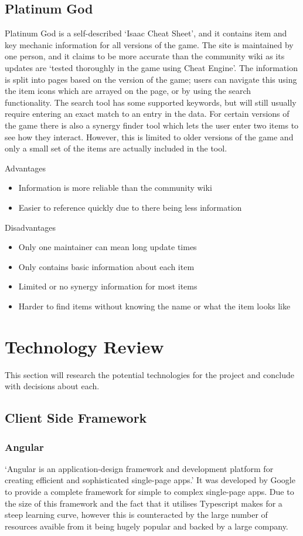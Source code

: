 \subsection*{Platinum God}
Platinum God is a self-described `Isaac Cheat Sheet'\cite{IsaacCheatSheet}, and it contains item and key mechanic 
information for all versions of the game. The site is maintained by one person, and it claims to be more accurate than 
the community wiki as its updates are `tested thoroughly in the game using Cheat Engine'\cite{FrequentlyAskedQuestions}. 
The information is split into pages based on the version of the game; users can navigate this using the item icons which
 are arrayed on the page, or by using the search functionality. The search tool has some supported keywords, but will 
still usually require entering an exact match to an entry in the data. For certain versions of the game there is also a 
synergy finder tool which lets the user enter two items to see how they interact. However, this is limited to older 
versions of the game and only a small set of the items are actually included in the tool. \par
Advantages
\begin{itemize}
    \item Information is more reliable than the community wiki
    \item Easier to reference quickly due to there being less information
\end{itemize}
Disadvantages
\begin{itemize}
    \item Only one maintainer can mean long update times
    \item Only contains basic information about each item
    \item Limited or no synergy information for most items
    \item Harder to find items without knowing the name or what the item looks like
\end{itemize}
\section{Technology Review}
This section will research the potential technologies for the project and conclude with decisions about each.
\subsection{Client Side Framework}
\subsubsection*{Angular}
`Angular is an application-design framework and development platform for creating efficient and sophisticated 
single-page apps.'\cite{AngularIntroductionAngular} It was developed by Google to provide a complete framework for 
simple to complex single-page apps. Due to the size of this framework and the fact that it utilises Typescript makes for
 a steep learning curve, however this is counteracted by the large number of resources avaible from it being hugely 
popular and backed by a large company.
